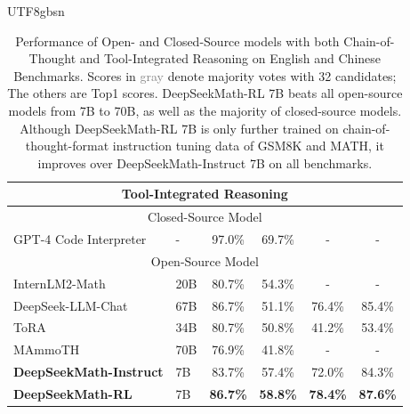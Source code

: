 \documentclass[11pt, a4paper, logo, copyright, nonumbering]{deepseek}
\newcommand{\spmath}{DeepSeekMath}
\begin{document}
\begin{CJK*}{UTF8}{gbsn}
\begin{table}[t!]
{\begin{tabular}{llcccc}
\midrule
\midrule
\multicolumn{6}{c}{\textbf{Tool-Integrated Reasoning}}                                                                                                                          \\ 
\midrule
\multicolumn{6}{c}{Closed-Source Model}                                                                                                                                         \\ 
\midrule
GPT-4 Code Interpreter &   -   & 97.0\%                         & 69.7\%          &            -     &          -                                                      \\ 
\midrule
\multicolumn{6}{c}{Open-Source Model}                                                                                                                                           \\ 
\midrule
InternLM2-Math & 20B           & 80.7\%                         & 54.3\%          &          -       &      -                                                               \\
DeepSeek-LLM-Chat & 67B        & 86.7\%                & 51.1\%          & 76.4\%          & 85.4\%                                                            \\
ToRA & 34B                     & 80.7\%                         & 50.8\%          & 41.2\%          & 53.4\%                                                              \\
MAmmoTH & 70B                  & 76.9\%                         & 41.8\%          &          -       &            -                                                         \\ 
\midrule
\textbf{\spmath-Instruct} & 7B     & 83.7\%                         & 57.4\%          & 72.0\%          & 84.3\%                                                                \\
\textbf{\spmath-RL} & 7B           & \textbf{86.7\%}                         & \textbf{58.8\%} & \textbf{78.4\%} & \textbf{87.6\%}                                                       \\
\bottomrule
\end{tabular}
}
    \caption{
   Performance of Open- and Closed-Source models with both Chain-of-Thought and Tool-Integrated Reasoning on English and Chinese Benchmarks.
   Scores in \textcolor{gray}{gray} denote majority votes with 32 candidates; The others are Top1 scores.
   \spmath-RL 7B beats all open-source models from 7B to 70B, as well as the majority of closed-source models. Although \spmath-RL 7B is only further trained on chain-of-thought-format instruction tuning data of GSM8K and MATH, it improves over \spmath-Instruct 7B on all benchmarks.
   }
    \label{tab:sft_rl_math}
\end{table}
\endgroup


\end{CJK*}
\end{document}
